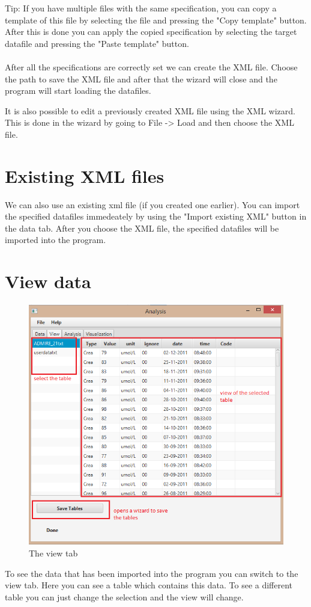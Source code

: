 \documentclass[a4paper]{article}
\begin{document}
\begin{enumerate}
Tip: If you have multiple files with the same specification, you can copy a template of this file by selecting the file and pressing the "Copy template" button. After this is done you can apply the copied specification by selecting the target datafile and pressing the "Paste template" button.
\\\\

After all the specifications are correctly set we can create the XML file. Choose the path to save the XML file and after that the wizard will close and the program will start loading the datafiles.

It is also possible to edit a previously created XML file using the XML wizard. This is done in the wizard by going to File -> Load and then choose the XML file.

\end{enumerate}

\section{Existing XML files}
We can also use an existing xml file (if you created one earlier). You can import the specified datafiles immedeately by using the "Import existing XML" button in the data tab. After you choose the XML file, the specified datafiles will be imported into the program.

\newpage

\section{View data}
\begin{figure}[h]
	\centering
	\includegraphics[scale=0.5]{viewtab.png}
 	\caption{The view tab}
	\label{fig:viewtab}
\end{figure}
To see the data that has been imported into the program you can switch to the view tab. Here you can see a table which contains this data. To see a different table you can just change the selection and the view will change.
\end{document}
